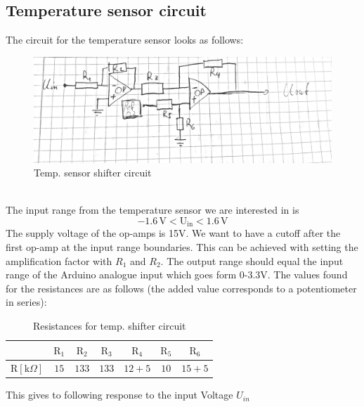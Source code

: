 \documentclass[12pt]{scrartcl}
\begin{document}
    \subsection{Temperature sensor circuit}
      The circuit for the temperature sensor looks as follows:
      \begin{figure}[h]
        \includegraphics[width = \textwidth]{circ.png}
        \caption{Temp. sensor shifter circuit}
        \label{fig1}
      \end{figure}
      \\The input range from the temperature sensor we are interested in is
      $$-1.6 \, \text{V} < \text{U}_{\text{in}} < 1.6\, \text{V}$$
      The supply voltage of the op-amps is 15V. We want to have a cutoff after
      the first op-amp at the input range boundaries. This can be achieved with
      setting the amplification factor with $R_1$ and $R_2$. The output range
      should equal the input range of the Arduino analogue input which goes form
      0-3.3V. The values found for the resistances are as follows (the added value
      corresponds to a potentiometer in series): \\
      \begin{table}[H]
        \begin{tabular}{l|c c c c c c}
          & $\text{R}_1$ & $\text{R}_2$ & $\text{R}_3$ & $\text{R}_4$
          & $\text{R}_5$ & $\text{R}_6$ \\
          \hline\vspace{5pt}
          $\text{R}[\text{k}\Omega]$ & $15$ & $133$ & $133$ & $12 + 5$ & $10$
          & $15 + 5$
        \end{tabular}
        \caption{Resistances for temp. shifter circuit}
      \end{table}
      This gives to following response to the input Voltage $U_{in}$\\
\end{document}
